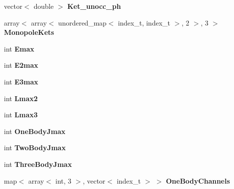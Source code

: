 \begin{DoxyCompactItemize}
\item 
vector$<$ double $>$ {\bfseries Ket\+\_\+unocc\+\_\+ph}\hypertarget{classModelSpace_adbab7c77ba2d7628be054a5ca13c3d60}{}\label{classModelSpace_adbab7c77ba2d7628be054a5ca13c3d60}

\item 
array$<$ array$<$ unordered\+\_\+map$<$ index\+\_\+t, index\+\_\+t $>$, 2 $>$, 3 $>$ {\bfseries Monopole\+Kets}\hypertarget{classModelSpace_a98149a6987fff9c2ed9898f38d017cae}{}\label{classModelSpace_a98149a6987fff9c2ed9898f38d017cae}

\item 
int {\bfseries Emax}\hypertarget{classModelSpace_a8b37b79cd05b3454135593cc25a60274}{}\label{classModelSpace_a8b37b79cd05b3454135593cc25a60274}

\item 
int {\bfseries E2max}\hypertarget{classModelSpace_aa2537fc9072788a01504f556084d50c6}{}\label{classModelSpace_aa2537fc9072788a01504f556084d50c6}

\item 
int {\bfseries E3max}\hypertarget{classModelSpace_ad2a482eaa2f453419f4092a7efee9ee7}{}\label{classModelSpace_ad2a482eaa2f453419f4092a7efee9ee7}

\item 
int {\bfseries Lmax2}\hypertarget{classModelSpace_acd0bc69b0db1fdd412443b8e0a67d9e3}{}\label{classModelSpace_acd0bc69b0db1fdd412443b8e0a67d9e3}

\item 
int {\bfseries Lmax3}\hypertarget{classModelSpace_ab1b256b3a8caaa5e81c566a711f9f8fb}{}\label{classModelSpace_ab1b256b3a8caaa5e81c566a711f9f8fb}

\item 
int {\bfseries One\+Body\+Jmax}\hypertarget{classModelSpace_a4c8f0a4476a3b3da3fced59d899f0134}{}\label{classModelSpace_a4c8f0a4476a3b3da3fced59d899f0134}

\item 
int {\bfseries Two\+Body\+Jmax}\hypertarget{classModelSpace_aa2fd94965eb8a508e5ea7d4c879bae0b}{}\label{classModelSpace_aa2fd94965eb8a508e5ea7d4c879bae0b}

\item 
int {\bfseries Three\+Body\+Jmax}\hypertarget{classModelSpace_af9ca130d96f582d0ed1a4ef5373bcd05}{}\label{classModelSpace_af9ca130d96f582d0ed1a4ef5373bcd05}

\item 
map$<$ array$<$ int, 3 $>$, vector$<$ index\+\_\+t $>$ $>$ {\bfseries One\+Body\+Channels}\hypertarget{classModelSpace_add00e0a37f8597748f903dffb1c5b2a5}{}\label{classModelSpace_add00e0a37f8597748f903dffb1c5b2a5}


\end{DoxyCompactItemize}
